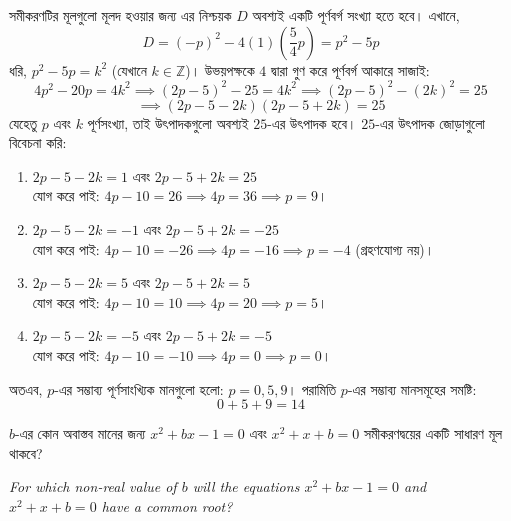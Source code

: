 \documentclass[12pt, a4paper]{article}
\begin{document}
\begin{tcolorbox}[solutionbox={সমাধান (Solution)}]
    \noindent
    সমীকরণটির মূলগুলো মূলদ হওয়ার জন্য এর নিশ্চয়ক $D$ অবশ্যই একটি পূর্ণবর্গ সংখ্যা হতে হবে। 
    এখানে, 
    \[ D = (-p)^2 - 4(1)\left(\frac{5}{4}p\right) = p^2 - 5p \]
    ধরি, $p^2 - 5p = k^2$ (যেখানে $k \in \mathbb{Z}$)। 
    উভয়পক্ষকে $4$ দ্বারা গুণ করে পূর্ণবর্গ আকারে সাজাই:
    \[ 4p^2 - 20p = 4k^2 \implies (2p-5)^2 - 25 = 4k^2 \implies (2p-5)^2 - (2k)^2 = 25 \]
    \[ \implies (2p-5-2k)(2p-5+2k) = 25 \]
    যেহেতু $p$ এবং $k$ পূর্ণসংখ্যা, তাই উৎপাদকগুলো অবশ্যই $25$-এর উৎপাদক হবে। $25$-এর উৎপাদক জোড়াগুলো বিবেচনা করি:
    \begin{enumerate}[itemsep=0.3em]
        \item $2p-5-2k = 1$ এবং $2p-5+2k = 25$ \\
        যোগ করে পাই: $4p-10 = 26 \implies 4p = 36 \implies p = 9$।
        \item $2p-5-2k = -1$ এবং $2p-5+2k = -25$ \\
        যোগ করে পাই: $4p-10 = -26 \implies 4p = -16 \implies p = -4$ (গ্রহণযোগ্য নয়)।
        \item $2p-5-2k = 5$ এবং $2p-5+2k = 5$ \\
        যোগ করে পাই: $4p-10 = 10 \implies 4p = 20 \implies p = 5$।
        \item $2p-5-2k = -5$ এবং $2p-5+2k = -5$ \\
        যোগ করে পাই: $4p-10 = -10 \implies 4p = 0 \implies p = 0$।
    \end{enumerate}
    
    \vspace{0.5em}
    অতএব, $p$-এর সম্ভাব্য পূর্ণসাংখ্যিক মানগুলো হলো: $p = 0, 5, 9$। 
    পরামিতি $p$-এর সম্ভাব্য মানসমূহের সমষ্টি:
    \[ 0 + 5 + 9 = 14 \]
\end{tcolorbox}

\vspace{1.5em}

\begin{tcolorbox}[questionbox={প্রশ্ন (Question) 37}]
    \noindent
    $b$-এর কোন অবাস্তব মানের জন্য $x^2 + bx - 1 = 0$ এবং $x^2 + x + b = 0$ সমীকরণদ্বয়ের একটি সাধারণ মূল থাকবে?
    
    \vspace{0.8em}
    \begin{english}
    \noindent\textit{\color{darkgray}
    For which non-real value of $b$ will the equations $x^2 + bx - 1 = 0$ and $x^2 + x + b = 0$ have a common root?
    }
    \end{english}
\end{tcolorbox}
\end{document}
